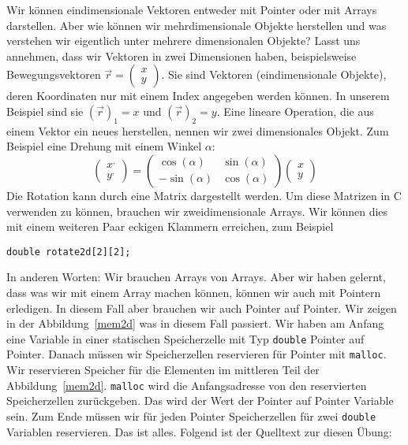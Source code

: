 Wir können eindimensionale Vektoren entweder mit Pointer oder mit Arrays darstellen.
Aber wie können wir mehrdimensionale Objekte herstellen und was verstehen wir eigentlich 
unter mehrere dimensionalen Objekte? Lasst uns annehmen, dass wir Vektoren in zwei Dimensionen haben,
beispielsweise Bewegungsvektoren $\vec{r}=\left(\begin{array}{c}x\\y\end{array}\right)$. Sie sind 
Vektoren (eindimensionale Objekte), deren Koordinaten nur mit einem Index angegeben werden
können. In unserem Beispiel sind sie $\left(\vec{r}\right)_1=x$ und $\left(\vec{r}\right)_2=y$.
Eine lineare Operation, die aus einem Vektor ein neues herstellen, nennen
wir zwei dimensionales Objekt. Zum Beispiel eine Drehung mit einem Winkel $\alpha$:
\begin{equation}
\left(\begin{array}{c}x^{,}\\y^{,}\end{array}\right)=
\left(\begin{array}{cc} \cos\left(\alpha\right) & \sin\left(\alpha\right) \\
                       -\sin\left(\alpha\right) & \cos\left(\alpha\right) 
\end{array}\right)
\left(\begin{array}{c}x\\y\end{array}\right)
\end{equation}
Die Rotation kann durch eine Matrix dargestellt werden. Um diese Matrizen
in C verwenden zu können, brauchen wir zweidimensionale Arrays. Wir können
dies mit einem weiteren Paar eckigen Klammern erreichen, zum Beispiel 
\begin{lstlisting}
double rotate2d[2][2];
\end{lstlisting}

In anderen Worten: Wir brauchen Arrays von Arrays. Aber wir haben gelernt, dass
was wir mit einem Array machen können, können wir auch mit Pointern erledigen.
In diesem Fall aber brauchen wir auch Pointer auf Pointer. Wir zeigen in der
Abbildung~\ref{mem2d} was in diesem Fall passiert. Wir haben am Anfang eine
Variable in einer statischen Speicherzelle mit Typ \texttt{double} Pointer auf
Pointer. Danach müssen wir Speicherzellen reservieren für Pointer mit
\texttt{malloc}. Wir reservieren Speicher für die Elementen im mittleren Teil
der Abbildung~\ref{mem2d}. \texttt{malloc} wird die Anfangsadresse von den
reservierten Speicherzellen zurückgeben. Das wird der Wert der Pointer auf
Pointer Variable sein. Zum Ende müssen wir für jeden Pointer Speicherzellen für
zwei \texttt{double} Variablen reservieren. Das ist alles. Folgend ist der
Quelltext zur diesen Übung:

